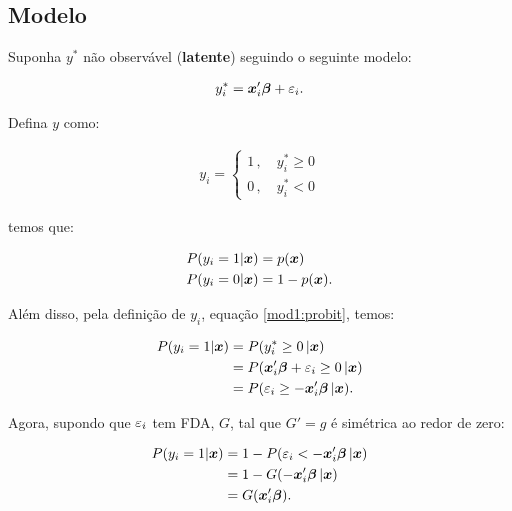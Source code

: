 \documentclass[11pt, oneside, a4paper, article]{article}
\numberwithin{equation}{section}
\begin{document}
\begin{description}
\begin{description}
\subsection*{Modelo}

Suponha $y^{*}$ não observável (\textbf{latente}) seguindo o seguinte modelo:

\vspace{-1 em}
\begin{align} \label{mod1:probit}
	y_{i}^{*} = \boldsymbol{x}_{i}' \boldsymbol{\beta} + \varepsilon_{i}.
\end{align}

\noindent
Defina $y$ como:

\vspace{-1 em}
\begin{align*}
y_{i} =
\begin{cases}
	1 \, , \quad y^{*}_{i} \geq 0
\\
	0 \, , \quad y^{*}_{i} < 0
\end{cases}
\end{align*}

\noindent
temos que:

\vspace{-1 em}
\begin{align*}
	P( y_{i} = 1 | \boldsymbol{x} ) &= p( \boldsymbol{x} )
	\\
	P( y_{i} = 0 | \boldsymbol{x} ) &= 1 - p( \boldsymbol{x} ).
\end{align*}

Além disso, pela definição de $y_{i}$, equação \eqref{mod1:probit}, temos:

\vspace{-1 em}
\begin{align*}
	P( y_{i} = 1 | \boldsymbol{x} ) &= P(y_{i}^{*} \geq 0 \, | \boldsymbol{x} )
\\
&= P( \boldsymbol{x}_{i}' \boldsymbol{\beta} + \varepsilon_{i} \geq 0 \, | \boldsymbol{x} )
\\
&= P( \varepsilon_{i} \geq - \boldsymbol{x}_{i}' \boldsymbol{\beta}  \, | \boldsymbol{x} ).
\end{align*}

\noindent
Agora, supondo que $\varepsilon_{i}$ tem FDA, $G$, tal que $G'=g$ é simétrica ao redor de zero:

\vspace{-1 em}
\begin{align*}
P( y_{i} = 1 | \boldsymbol{x} ) 
&= 1 - P( \varepsilon_{i} < - \boldsymbol{x}_{i}' \boldsymbol{\beta}  \, | \boldsymbol{x} )
\\
&= 1 - G( - \boldsymbol{x}_{i}' \boldsymbol{\beta}  \, | \boldsymbol{x} )
\\
&= G( \boldsymbol{x}_{i}' \boldsymbol{\beta} ).
\end{align*}


\end{description}
\end{description}
\end{document}
